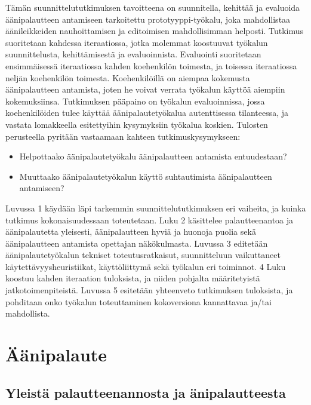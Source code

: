\documentclass[utf8]{gradu3}
\begin{document}
Tämän suunnittelututkimuksen tavoitteena on suunnitella, kehittää ja evaluoida äänipalautteen antamiseen tarkoitettu prototyyppi-työkalu, joka mahdollistaa äänileikkeiden nauhoittamisen ja editoimisen mahdollisimman helposti. Tutkimus suoritetaan kahdessa iteraatiossa, jotka molemmat koostuuvat työkalun suunnittelusta, kehittämisestä ja evaluoinnista. Evaluointi suoritetaan ensimmäisessä iteraatiossa kahden koehenkilön toimesta, ja toisessa iteraatiossa neljän koehenkilön toimesta. Koehenkilöillä on aiempaa kokemusta äänipalautteen antamista, joten he voivat verrata työkalun käyttöä aiempiin kokemuksiinsa. Tutkimuksen pääpaino on työkalun evaluoinnissa, jossa koehenkilöiden tulee käyttää äänipalautetyökalua autenttisessa tilanteessa, ja vastata lomakkeella esitettyihin kysymyksiin työkalua koskien. Tulosten perusteella pyritään vastaamaan kahteen tutkimuskysymykseen:

\begin{itemize}
  \item Helpottaako äänipalautetyökalu äänipalautteen antamista entuudestaan?
  \item Muuttaako äänipalautetyökalun käyttö suhtautimista äänipalautteen antamiseen?
\end{itemize}

Luvussa 1 käydään läpi tarkemmin suunnittelututkimuksen eri vaiheita, ja kuinka tutkimus kokonaisuudessaan toteutetaan. Luku 2 käsittelee palautteenantoa ja äänipalautetta yleisesti, äänipalautteen hyviä ja huonoja puolia sekä äänipalautteen antamista opettajan näkökulmasta. Luvussa 3 editetään äänipalautetyökalun tekniset toteutusratkaisut, suunnitteluun vaikuttaneet käytettävyysheuristiikat, käyttöliittymä sekä työkalun eri toiminnot. 4 Luku koostuu kahden iteraation tuloksista, ja niiden pohjalta määritetyistä jatkotoimenpiteistä. Luvussa 5 esitetään yhteenveto tutkimuksen tuloksista, ja pohditaan onko työkalun toteuttaminen kokoversiona kannattavaa ja/tai mahdollista.

\chapter{Äänipalaute}

\section{Yleistä palautteenannosta ja änipalautteesta}
\end{document}
